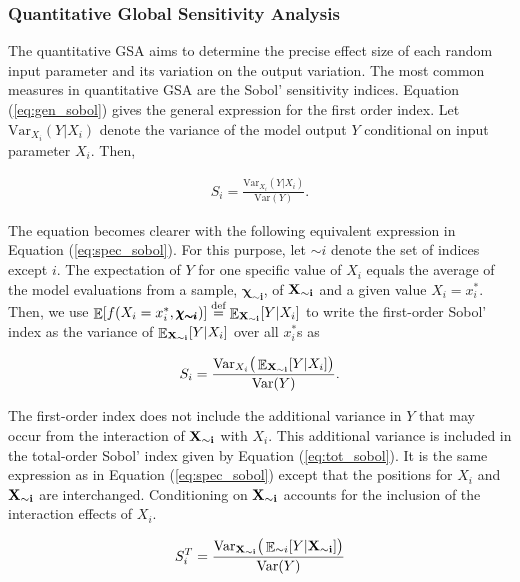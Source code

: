 \documentclass[a4paper,12pt]{article}
\DeclareMathOperator*{\E}{\mathbb{E}}
\newcommand*{\defeq}{\stackrel{\text{def}}{=}}
\begin{document}
\subsubsection{Quantitative Global Sensitivity Analysis}

The quantitative GSA aims to determine the precise effect size of each random input parameter and its variation on the output variation. The most common measures in quantitative GSA are the Sobol' sensitivity indices. Equation (\ref{eq:gen_sobol}) gives the general expression for the first order index. Let $\text{Var}_{X_i} (Y|X_i)$ denote the variance of the model output $Y$ conditional on input parameter $X_i$. Then,

\begin{align} \label{eq:gen_sobol}
S_i = \frac{\text{Var}_{X_i}(Y|X_i)}{\text{Var}(Y)}.
\end{align}

\noindent
The equation becomes clearer with the following equivalent expression in Equation (\ref{eq:spec_sobol}).
For this purpose, let $\sim i$ denote the set of indices except $i$. The expectation of $Y$ for one specific value of $X_i$ equals the average of the model evaluations from a sample, $\pmb{\chi_{\sim i}}$,  of $\bold{X_{\sim i}}$ and a given value
$X_i = x_i^*$. Then, we use $\E[f(X_i = x_i^*,\pmb{\chi_{\sim i}} )] \defeq \E_{\bold{X_{\sim i}}} [Y|X_i ]$ to write the first-order Sobol' index as the variance of $\E_{\bold{X_{\sim i}}} [Y|X_i ]$ over all $x_i^*$s as


\begin{align} \label{eq:spec_sobol}
S_i = \frac{\text{Var}_{X_i}\big( \E_{\bold{X_{\sim i}}} [Y|X_i ]\big)}{\text{Var}(Y)}.
\end{align}


\noindent
The first-order index does not include the additional variance in $Y$ that may occur from the interaction of $\bold{X_{\sim i}}$ with $X_i$. This additional variance is included in the total-order Sobol' index given by Equation (\ref{eq:tot_sobol}). It is the same expression as in Equation (\ref{eq:spec_sobol}) except that the positions for $X_i$ and $\bold{X_{\sim i}}$ are interchanged. Conditioning on $\bold{X_{\sim i}}$ accounts for the inclusion of the interaction effects of $X_i$.


\begin{align} \label{eq:tot_sobol}
S_{i}^T = \frac{\text{Var}_{\bold{X_{\sim i}}}\big( \E_{\sim i}[Y|\bold{X_{\sim i}]} \big)}{\text{Var}(Y)}
\end{align}
\end{document}
